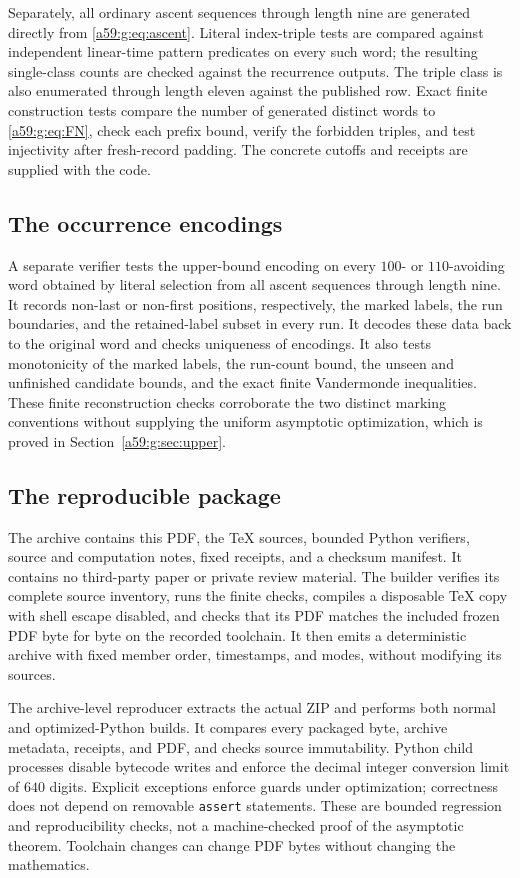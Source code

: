 \documentclass[11pt,letterpaper]{article}
\theoremstyle{remark}\newtheorem{remark}[theorem]{Remark}
\theoremstyle{remark}\newtheorem{wremark}{Remark}\renewcommand{\thewremark}{W\arabic{wremark}}
\theoremstyle{plain}\newtheorem{wcorollary}[wremark]{Corollary}
\begin{document}
Separately, all ordinary ascent sequences through length nine are generated directly from \eqref{a59:g:eq:ascent}. Literal index-triple tests are compared against independent linear-time pattern predicates on every such word; the resulting single-class counts are checked against the recurrence outputs. The triple class is also enumerated through length eleven against the published row. Exact finite construction tests compare the number of generated distinct words to \eqref{a59:g:eq:FN}, check each prefix bound, verify the forbidden triples, and test injectivity after fresh-record padding. The concrete cutoffs and receipts are supplied with the code.

\subsection{The occurrence encodings}
A separate verifier tests the upper-bound encoding on every $100$- or $110$-avoiding word obtained by literal selection from all ascent sequences through length nine. It records non-last or non-first positions, respectively, the marked labels, the run boundaries, and the retained-label subset in every run. It decodes these data back to the original word and checks uniqueness of encodings. It also tests monotonicity of the marked labels, the run-count bound, the unseen and unfinished candidate bounds, and the exact finite Vandermonde inequalities. These finite reconstruction checks corroborate the two distinct marking conventions without supplying the uniform asymptotic optimization, which is proved in Section~\ref{a59:g:sec:upper}.

\subsection{The reproducible package}
The archive contains this PDF, the TeX sources, bounded Python verifiers, source and computation notes, fixed receipts, and a checksum manifest. It contains no third-party paper or private review material. The builder verifies its complete source inventory, runs the finite checks, compiles a disposable TeX copy with shell escape disabled, and checks that its PDF matches the included frozen PDF byte for byte on the recorded toolchain. It then emits a deterministic archive with fixed member order, timestamps, and modes, without modifying its sources.

The archive-level reproducer extracts the actual ZIP and performs both normal and optimized-Python builds. It compares every packaged byte, archive metadata, receipts, and PDF, and checks source immutability. Python child processes disable bytecode writes and enforce the decimal integer conversion limit of $640$ digits. Explicit exceptions enforce guards under optimization; correctness does not depend on removable \texttt{assert} statements. These are bounded regression and reproducibility checks, not a machine-checked proof of the asymptotic theorem. Toolchain changes can change PDF bytes without changing the mathematics.
\end{document}

